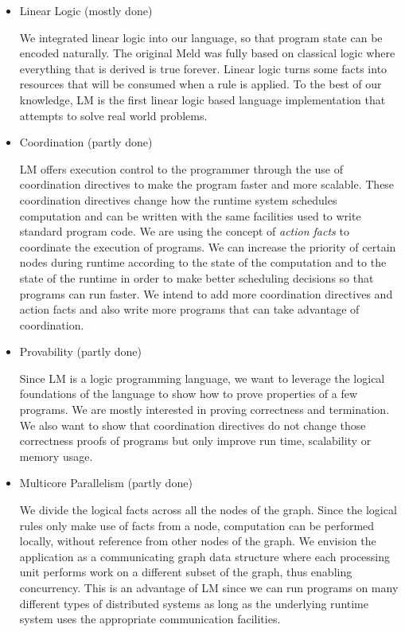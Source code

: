 \documentclass[10pt]{article}
\begin{document}
\begin{itemize}
   
   \item Linear Logic (mostly done)

   We integrated linear logic into our language, so that program state can be
   encoded naturally. The original Meld was fully based on classical logic where
   everything that is derived is true forever. Linear logic turns some facts
   into resources that will be consumed when a rule is applied.  To the best of
   our knowledge, LM is the first linear logic based language implementation
   that attempts to solve real world problems.

   \item Coordination (partly done)
   
   LM offers execution control to the programmer through the use of coordination
   directives to make the program faster and more scalable. These coordination
   directives change how the runtime system schedules computation and can be
   written with the same facilities used to write standard program code.  We are
   using the concept of \emph{action facts} to coordinate the execution of
   programs.  We can increase the priority of certain nodes during runtime
   according to the state of the computation and to the state of the runtime in
   order to make better scheduling decisions so that programs can run faster.
   We intend to add more coordination directives and action facts and also write
   more programs that can take advantage of coordination.
   
   \item Provability (partly done)
   
   Since LM is a logic programming language, we want to leverage the logical
   foundations of the language to show how to prove properties of a few
   programs. We are mostly interested in proving correctness and termination.
   We also want to show that coordination directives do not change those
   correctness proofs of programs but only improve run time, scalability or
   memory usage.

   \item Multicore Parallelism (partly done)
   
   We divide the logical facts across all the nodes of the graph. Since the
   logical rules only make use of facts from a node, computation can be
   performed locally, without reference from other nodes of the graph.
   We envision the application as a communicating graph data structure where
   each processing unit performs work on a different subset of the graph, thus
   enabling concurrency. This is an advantage of LM since we can run programs on
   many different types of distributed systems as long as the underlying runtime
   system uses the appropriate communication facilities.


\end{itemize}
\end{document}
